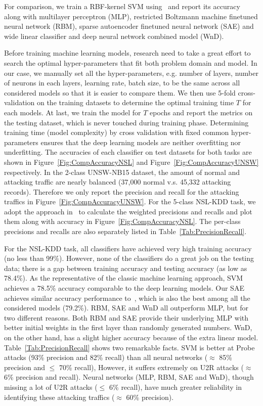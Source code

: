 For comparison, we train a RBF-kernel SVM using~\cite{ScikitLearnSVM} and report its accuracy along
with multilayer perceptron (MLP), restricted Boltzmann machine finetuned neural network (RBM),
sparse autoencoder finetuned neural network (SAE) and wide linear classifier and deep neural network combined model (WnD).

Before training machine learning models, research need to take a great effort to search
the optimal hyper-parameters that fit both problem domain and model.
In our case, we manually set all the hyper-parameters, e.g. number of layers, number of neurons
in each layers, learning rate, batch size, to be the same across all considered models
so that it is easier to compare them.
We then use 5-fold cross-validation on the training datasets to determine the optimal training time $T$
for each models.
At last, we train the model for $T$ epochs and report the metrics on the testing dataset,
which is never touched during training phase.
Determining training time (model complexity) by cross validation with fixed common hyper-parameters
ensures that the deep learning models are neither overfitting nor underfitting.
The accuracies of each classifier on test datasets for both tasks are
shown in Figure~\ref{Fig:CompAccuracyNSL} and Figure~\ref{Fig:CompAccuracyUNSW} respectively.
In the 2-class UNSW-NB15 dataset,
the amount of normal and attacking traffic are nearly balanced (37,000 normal v.s. 45,332 attacking records).
Therefore we only report the precision and recall for the attacking traffics in Figure~\ref{Fig:CompAccuracyUNSW}.
For the 5-class NSL-KDD task, we adopt the approach in~\cite{STL-NIDS}
to calculate the weighted precisions and recalls and plot them along with accuracy in Figure~\ref{Fig:CompAccuracyNSL}.
The per-class precisions and recalls are also separately listed in Table~\ref{Tab:PrecisionRecall}.

For the NSL-KDD task, all classifiers have achieved very high training accuracy (no less than 99\%).
However, none of the classifiers do a great job on the testing data;
there is a gap between training accuracy and testing accuracy (as low as 78.4\%).
As the representative of the classic machine learning approach, SVM achieves a 78.5\% accuracy
comparable to the deep learning models.
Our SAE achieves similar accuracy performance to~\cite{STL-NIDS}, which is
also the best among all the considered models (79.2\%).
RBM, SAE and WnD all outperform MLP, but for two different reasons.
Both RBM and SAE provide their underlying MLP with better initial weights in the first layer
than randomly generated numbers.
WnD, on the other hand, has a slight higher accuracy because of the extra linear model.
Table~\ref{Tab:PrecisionRecall} shows two remarkable facts.
SVM is better at Probe attacks (93\% precision and 82\% recall)
than all neural networks ($\approx$ 85\% precision and $\leq$ 70\% recall),
However, it suffers extremely on U2R attacks ($\approx$ 6\% precision and recall).
Neural networks (MLP, RBM, SAE and WnD), though missing a lot of U2R attacks ($\leq$ 6\% recall),
have much greater reliability in identifying these attacking traffics ($\approx$ 60\% precision).


